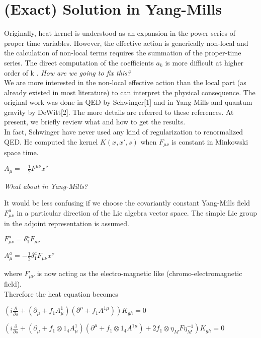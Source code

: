 \documentclass[a4paper,12 pt]{article}
\begin{document}
\section{(Exact) Solution in Yang-Mills}
Originally, heat kernel is understood as an expansion in the power
series of proper time variables. However, the effective action is
generically non-local and the calculation of non-local terms
requires the summation of the proper-time series. The direct
computation of the coefficients $ a_{k}$ is more difficult at
higher order of k . \emph{How are we going to fix this?} \\We are
more interested in the non-local effective action than the local
part (as already existed in most literature) to can interpret the
physical consequence. The original work was done in QED by
Schwinger[1] and in Yang-Mills and quantum gravity by DeWitt[2].
The more details are referred to these references. At present, we
briefly review what and how to get the results.
\\In fact, Schwinger have never used any kind of regularization to
renormalized QED.  He computed the kernel $ K(x,x',s)$ when $
F_{\mu\nu} $ is constant in Minkowski space time.
\begin{center}
$ A_{\mu} = - \frac{1}{2}F^{\mu\nu}x^{\nu}$
\end{center}
\begin{center}
\emph{What about in Yang-Mills?}
\end{center}
It would be less confusing if we choose the covariantly constant
Yang-Mills field $ F^{a}_{\mu\nu}$ in a particular direction of
the Lie algebra vector space. The simple Lie group in the adjoint
representation is assumed.
\begin{center}
$ F^{a}_{\mu\nu} = \delta^{a}_{1} F_{\mu\nu}$
\end{center}
\begin{center}
 $ A^{a}_{\mu} =
-\frac{1}{2} \delta_{1}^{a} F_{\mu\nu} x^{\nu}$
\end{center}
where $ F_{\mu\nu}$ is now acting as the electro-magnetic like
(chromo-electromagnetic field).\\
Therefore the heat equation becomes
\begin{center}
$ (i\frac{\partial}{\partial s} + (\partial_{\mu}+
f_{1}A^{1}_{\mu})(\partial^{\mu}+ f_{1}A^{1 \mu}))K_{gh} = 0 $
\end{center}
\begin{center}
 $
(i\frac{\partial}{\partial s} + (\partial_{\mu}+ f_{1}\otimes
1_{4}A^{1}_{\mu})(\partial^{\mu}+ f_{1}\otimes 1_{4}A^{1 \mu}) + 2
f_{1}\otimes \eta_{M}F\eta_{M}^{-1})K_{gh} = 0 $
\end{center}
\end{document}
